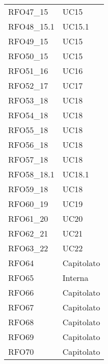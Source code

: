 \begin{longtable}{|C{6cm} C{3cm}|}
    RFO47\_15 & UC15 \\
    
    RFO48\_15.1 & UC15.1 \\
    
    RFO49\_15 & UC15 \\
    
    RFO50\_15 & UC15 \\
    
    RFO51\_16 & UC16 \\
    
    RFO52\_17 & UC17 \\
    
    RFO53\_18 & UC18 \\
    
    RFO54\_18 & UC18 \\
    
    RFO55\_18 & UC18 \\
    
    RFO56\_18 & UC18 \\
    
    RFO57\_18 & UC18 \\
    
    RFO58\_18.1 & UC18.1 \\
    
    RFO59\_18 & UC18 \\
    
    RFO60\_19 & UC19 \\
    
    RFO61\_20 & UC20 \\
    
    RFO62\_21 & UC21 \\
    
    RFO63\_22 & UC22 \\

    RFO64 & Capitolato \\
    
    RFO65 & Interna \\
    
    RFO66 & Capitolato \\
    
    RFO67 & Capitolato \\
        
    RFO68 & Capitolato \\
    
    RFO69 & Capitolato \\
    
    RFO70 & Capitolato \\
    

\end{longtable}
